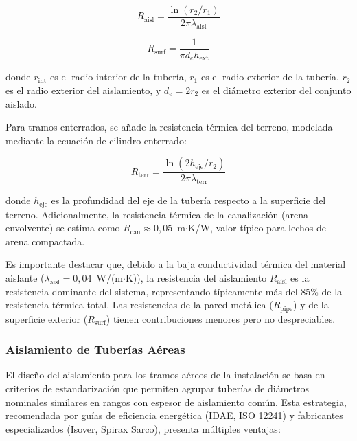 \begin{equation}
	R_{\text{aisl}} = \frac{\ln(r_2 / r_1)}{2\pi \lambda_{\text{aisl}}}
	\label{eq:resist_aislamiento}
\end{equation}

\begin{equation}
	R_{\text{surf}} = \frac{1}{\pi d_e h_{\text{ext}}}
	\label{eq:resist_superficie}
\end{equation}

\noindent donde $r_{\text{int}}$ es el radio interior de la tubería, $r_1$ es el radio exterior de la tubería, $r_2$ es el radio exterior del aislamiento, y $d_e = 2r_2$ es el diámetro exterior del conjunto aislado.

Para tramos enterrados, se añade la resistencia térmica del terreno, modelada mediante la ecuación de cilindro enterrado:

\begin{equation}
	R_{\text{terr}} = \frac{\ln(2 h_{\text{eje}} / r_2)}{2\pi \lambda_{\text{terr}}}
	\label{eq:resist_terreno}
\end{equation}

\noindent donde $h_{\text{eje}}$ es la profundidad del eje de la tubería respecto a la superficie del terreno. Adicionalmente, la resistencia térmica de la canalización (arena envolvente) se estima como $R_{\text{can}} \approx 0{,}05$~m$\cdot$K/W, valor típico para lechos de arena compactada.

Es importante destacar que, debido a la baja conductividad térmica del material aislante ($\lambda_{\text{aisl}} = 0{,}04$~W/(m$\cdot$K)), la resistencia del aislamiento $R_{\text{aisl}}$ es la resistencia dominante del sistema, representando típicamente más del 85\% de la resistencia térmica total. Las resistencias de la pared metálica ($R_{\text{pipe}}$) y de la superficie exterior ($R_{\text{surf}}$) tienen contribuciones menores pero no despreciables.


\subsubsection{Aislamiento de Tuberías Aéreas}
\label{subsubsec:aislamiento_aereo}

El diseño del aislamiento para los tramos aéreos de la instalación se basa en criterios de estandarización que permiten agrupar tuberías de diámetros nominales similares en rangos con espesor de aislamiento común. Esta estrategia, recomendada por guías de eficiencia energética (IDAE, ISO 12241) y fabricantes especializados (Isover, Spirax Sarco), presenta múltiples ventajas:

